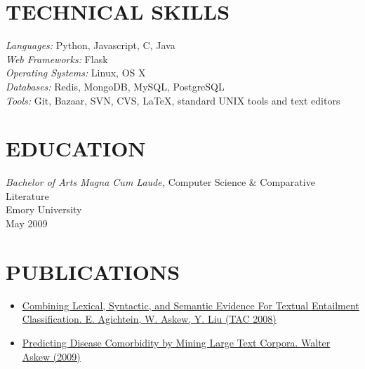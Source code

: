 \documentclass[line,margin]{res}
\begin{document}
\begin{resume}
\section{TECHNICAL SKILLS}
        {\sl Languages:} Python, Javascript, C, Java \\
        {\sl Web Frameworks:} Flask \\
        {\sl Operating Systems:} Linux, OS X\\
        {\sl Databases:} Redis, MongoDB, MySQL, PostgreSQL \\
        {\sl Tools:} Git, Bazaar, SVN, CVS, \LaTeX, standard UNIX tools and
        text editors 

\section{EDUCATION}
        {\sl Bachelor of Arts Magna Cum Laude,}
        Computer Science \& Comparative Literature \\
        Emory University \\
        May 2009

\section{PUBLICATIONS}
\begin{itemize}
  \item \href{http://www.nist.gov/tac/publications/2008/participant.papers/Emory.proceedings.pdf}{Combining Lexical, Syntactic, and Semantic Evidence For
      Textual Entailment Classification.  E. Agichtein, W. Askew, Y. Liu
      (TAC 2008)}
  \item \href{https://etd.library.emory.edu/view/record/pid/emory:1b6tn}
    {Predicting Disease Comorbidity by Mining Large Text
      Corpora. Walter Askew (2009)}
\end{itemize}

\end{resume}
\end{document}
